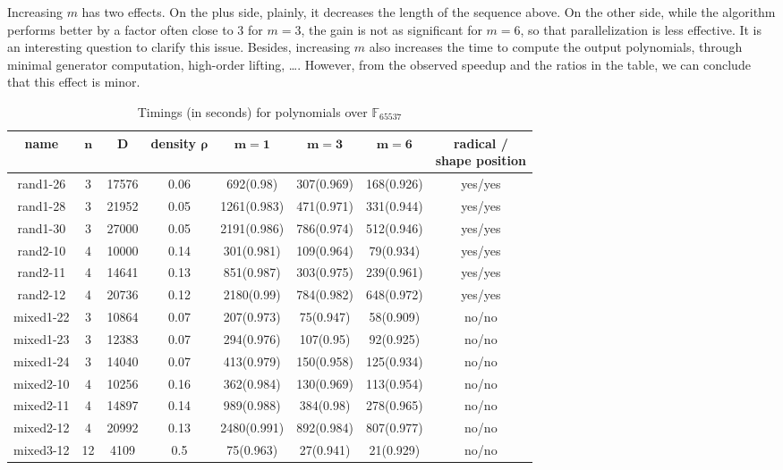\documentclass[12pt]{article}
\def\F {\ensuremath{\mathbb{F}}}
\begin{document}
Increasing $m$ has two effects. On the plus side, plainly, it
decreases the length of the sequence above. On the other side, while
the algorithm performs better by a factor often close to 3 for $m=3$,
the gain is not as significant for $m=6$, so that parallelization is
less effective. It is an interesting question to clarify this issue.  Besides, increasing $m$ also increases the time to
compute the output polynomials, through minimal generator computation,
high-order lifting, \dots. However, from the observed speedup and the
ratios in the table, we can conclude that this effect is minor.


\begin{table}[H]
  \centering
 \def\arraystretch{1.2}
\setlength\tabcolsep{6pt}
	\caption{Timings (in seconds) for polynomials over $\F_{65537}$}
  \label{tbl:timings_mainalgo}
	\begin{tabular}{c|c|c|c|c|c|c|c}
		\textbf{name}& $\bm{n}$ & $\bm{D}$ & \textbf{density} $\boldsymbol\rho$ & $\bm{m = 1}$ & $\bm{m = 3}$ & $\bm{m = 6}$ 
                & \makecell{\textbf{radical} / \\\textbf{shape position}} \\
		\hline
rand1-26&3 &17576&0.06& 692(0.98) & 307(0.969) & 168(0.926) & yes/yes \\
rand1-28&3 &21952&0.05&1261(0.983) & 471(0.971) & 331(0.944)& yes/yes  \\
rand1-30&3 &27000&0.05&2191(0.986) & 786(0.974) & 512(0.946)& yes/yes  \\
rand2-10&4 &10000&0.14&301(0.981) & 109(0.964) & 79(0.934)& yes/yes  \\
rand2-11&4 &14641&0.13&851(0.987) & 303(0.975) & 239(0.961) & yes/yes \\
rand2-12&4&20736&0.12&2180(0.99) & 784(0.982) & 648(0.972)& yes/yes  \\
mixed1-22&3 &10864&0.07&207(0.973) & 75(0.947) & 58(0.909) &no/no \\
mixed1-23&3 &12383&0.07&294(0.976) & 107(0.95) & 92(0.925) &no/no  \\
mixed1-24&3 &14040&0.07&413(0.979) & 150(0.958) & 125(0.934) &no/no  \\
mixed2-10&4 &10256&0.16&362(0.984) & 130(0.969) & 113(0.954)  &no/no \\
mixed2-11&4 &14897&0.14&989(0.988) & 384(0.98) & 278(0.965)  &no/no \\
mixed2-12&4 &20992&0.13&2480(0.991) & 892(0.984) & 807(0.977)  &no/no \\
mixed3-12&12 &4109&0.5&75(0.963) & 27(0.941) & 21(0.929)  &no/no \\

\end{tabular}
\end{table}
\end{document}
